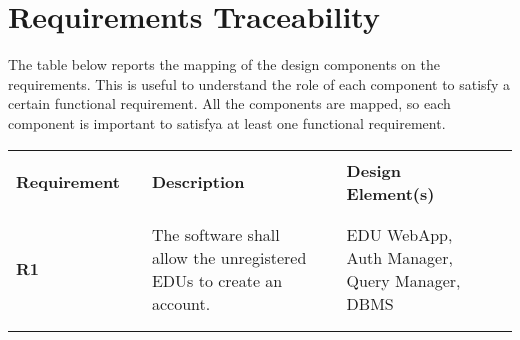 \chapter{Requirements Traceability}
The table below reports the mapping of the design components on the requirements. This is useful to understand the role of each component to satisfy a certain functional requirement. All the components are mapped, so each component is important to satisfya at least one functional requirement.

\renewcommand{\arraystretch}{0.5}
\begin{longtable}[H]{l l p{6cm} l p{4cm} l}
    \hline
                  &        &                                                                                                                                                                                                                                                                                        &        &                        \\
    \textbf{Requirement}    & \vline & \textbf{Description}                                                                                                                                                                                                                                                         & \vline & \textbf{Design Element(s)} \\
                            &        &                                                                                                                                                                                                                                                                              &        &       \\\hline  & & \\ 
    \textbf{R1}             & \vline & The software shall allow the unregistered EDUs to create an account.                                                                                                                                                                                                         & \vline &  EDU WebApp, Auth Manager, Query Manager, DBMS \\
                            &        &                                                                                                                                                                                                                                                                              &        &       \\\hline  & & \\ 

\end{longtable}
